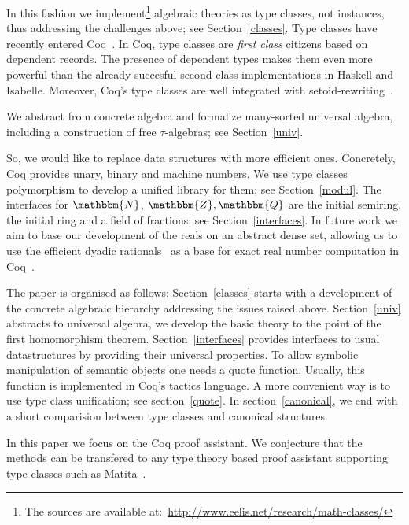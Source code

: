 \documentclass[a4paper,10pt,runningheads]{llncs}
\newcommand{\N}{\ensuremath{\mathbbm{N}}}
\newcommand{\Z}{\ensuremath{\mathbbm{Z}}}
\newcommand{\Q}{\ensuremath{\mathbbm{Q}}}
\begin{document}
In this fashion we implement\footnote{The sources are available
at:~\url{http://www.eelis.net/research/math-classes/}}
 algebraic theories as type classes, not instances, thus addressing the
challenges above; see Section~\ref{classes}. Type classes have recently entered
Coq~\cite{DBLP:conf/tphol/SozeauO08}. In Coq,
type classes are \emph{first class} citizens based on dependent records. The presence of dependent types makes them even more
powerful than the already succesful second class implementations in Haskell and Isabelle. Moreover,
Coq's type classes are well integrated with setoid-rewriting~\cite{Setoid-rewrite}.

We abstract from concrete algebra and formalize many-sorted universal algebra, including a
construction of free $\tau$-algebras; see Section~\ref{univ}.


So, we would like to replace data structures with more efficient ones. Concretely,
Coq provides unary, binary and machine numbers. We use type classes polymorphism to
develop a unified library for them; see Section~\ref{modul}.
The interfaces for $\N$, $\Z,\Q$ are the initial semiring, the initial ring and a field of
fractions; see Section~\ref{interfaces}. In future work we aim to base our development of the reals
on an abstract dense set, allowing us to use the efficient dyadic
rationals~\cite{boldo2009combining} as a base for exact real number computation in
Coq~\cite{Riemann,Oconnor:real}.

The paper is organised as follows: Section~\ref{classes} starts with a development of the concrete
algebraic hierarchy addressing the issues raised above. Section~\ref{univ} abstracts to universal
algebra, we develop the basic theory to the point of the first homomorphism theorem.
Section~\ref{interfaces} provides interfaces to usual datastructures by providing their universal
properties. To allow symbolic manipulation of semantic objects one needs a quote function. Usually,
this function is implemented in Coq's tactics language. A more convenient way is to use type class
unification; see section~\ref{quote}. In section~\ref{canonical}, we end with a short comparision
between type classes and canonical structures.

In this paper we focus on the Coq proof assistant. We conjecture that the methods can be transfered
to any type theory based proof assistant supporting type classes such as
Matita~\cite{asperti2007user}.
\end{document}
